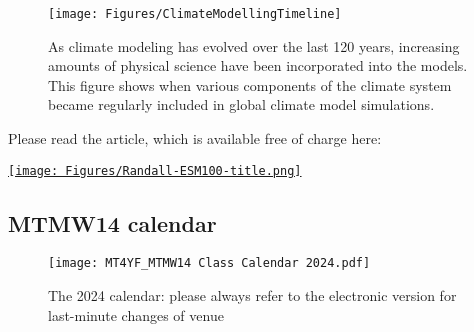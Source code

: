 \documentclass[11pt,fleqn]{book} %
\begin{document}
		\begin{figure}[h!]
		\texttt{[image: Figures/ClimateModellingTimeline]}
		\caption{As climate modeling has evolved over the last 120 years, increasing amounts of physical science have been incorporated into the models. This figure shows when various components of the climate system became regularly included in global climate model simulations.}
	\end{figure}

	Please read the article, which is available free of charge here:  

\href{https://journals.ametsoc.org/view/journals/amsm/59/1/amsmonographs-d-18-0018.1.xml} {\texttt{[image: Figures/Randall-ESM100-title.png]}}

\clearpage
\subsection{MTMW14 calendar}

\begin{figure}[h!]
	\texttt{[image: MT4YF\_MTMW14 Class Calendar 2024.pdf]}
	\caption{The 2024 calendar: please always refer to the electronic version for last-minute changes of venue}
\end{figure}

\newpage	


\newpage	


\newpage	


\newpage	


\newpage	


\newpage	


\newpage	


\newpage	


\newpage	

\end{document}
